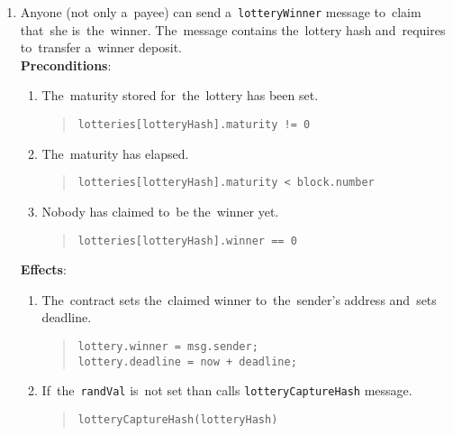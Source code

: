 \documentclass[a4paper]{article}
\begin{document}
\begin{enumerate}
        \item Anyone (not only a~payee) can send a~\texttt{lotteryWinner} message to~claim that~she is~the~winner.
            The~message contains the~lottery hash and~requires to~transfer a~winner deposit.\\
            \textbf{Preconditions}:
            \begin{enumerate}
            \item The~maturity stored for~the~lottery has been set.
              \begin{quote}
                \verb|lotteries[lotteryHash].maturity != 0|
              \end{quote}
            \item The~maturity has elapsed.
              \begin{quote}
		\verb|lotteries[lotteryHash].maturity < block.number|
	      \end{quote}
            \item Nobody has claimed to~be the~winner yet.
              \begin{quote}
                \verb|lotteries[lotteryHash].winner == 0|
              \end{quote}
            \end{enumerate}
            \textbf{Effects}:
            \begin{enumerate}
            \item The~contract sets the~claimed winner to~the~sender's address and~sets deadline.
              \begin{quote}
                \verb|lottery.winner = msg.sender;|\\
                \verb|lottery.deadline = now + deadline;|
              \end{quote}
            \item If~the~\texttt{randVal} is~not set than calls \texttt{lotteryCaptureHash} message.
              \begin{quote}
                \verb|lotteryCaptureHash(lotteryHash)|
              \end{quote}
            \end{enumerate}
            

\end{enumerate}
\end{document}

